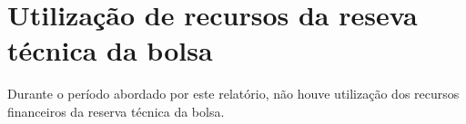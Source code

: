 \documentclass[11pt]{article}
\begin{document}
\newpage

\section*{Utilização de recursos da reseva técnica da bolsa}

Durante o período abordado por este relatório, não houve utilização dos recursos financeiros da reserva técnica da bolsa.

\newpage

\printbibliography
\end{document}
